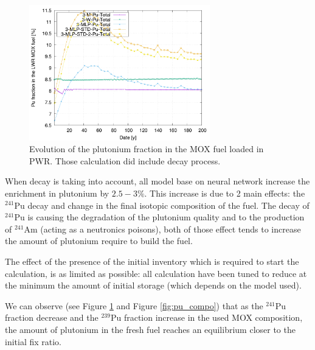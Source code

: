 \documentclass[10pt]{article}
\begin{document}
\begin{figure}[h!]
  \centering
  \includegraphics[width=0.7\textwidth]  {img/C_1_3_MOX_pu_contribution}
  \caption{Evolution of the plutonium fraction in the MOX fuel loaded in PWR.
  Those calculation did include decay process.}
  \label{fig:puflow_D}
\end{figure}
%  
%

When decay is taking into account, all model base on neural network increase the
enrichment in plutonium by $2.5-3\%$. This increase is due to 2 main effects:
the $^{241}$Pu decay and change in the final isotopic composition of the fuel.
The decay of $^{241}$Pu is causing the degradation of the plutonium quality and
to the production of $^{241}$Am (acting as a neutronics poisons), both of those
effect tends to increase the amount of plutonium require to build the fuel.

The effect of the presence of the initial inventory which is required to start
the calculation, is as limited as possible: all calculation have been tuned to
reduce at the minimum the amount of initial storage (which depends on the model
used).

We can observe (see Figure \ref{fig:puflow_D} and Figure \ref{fig:pu_compo})
that as the $^{241}$Pu fraction decrease and the $^{239}$Pu fraction increase in
the used MOX composition, the amount of plutonium in the fresh fuel reaches an
equilibrium closer to the initial fix ratio.
\end{document}
